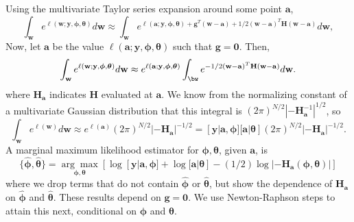 \documentclass[12pt, titlepage]{article}
\begin{document}
Using the multivariate Taylor series expansion around some point $\mathbf{a}$,
$$
\int_\mathbf{w} e^{\ell(\mathbf{w};\mathbf{y},\boldsymbol{\phi},\boldsymbol{\theta})} d\mathbf{w} \approx \int_\mathbf{w} e^{\ell(\mathbf{a};\mathbf{y},\boldsymbol{\phi},\boldsymbol{\theta}) + \mathbf{g}^{T}(\mathbf{w} -\mathbf{a}) + 1/2(\mathbf{w} - \mathbf{a})^{T}\mathbf{H}(\mathbf{w} - \mathbf{a})} d\mathbf{w},
$$
Now, let $\mathbf{a}$ be the value $\ell(\mathbf{a};\mathbf{y},\boldsymbol{\phi},\boldsymbol{\theta})$ such that $\mathbf{g} = \mathbf{0}$. Then,
$$
\int_\mathbf{w} e^{\ell(\mathbf{w};\mathbf{y},\boldsymbol{\phi},\boldsymbol{\theta})} d\mathbf{w} \approx e^{\ell(\mathbf{a};\mathbf{y},\boldsymbol{\phi},\boldsymbol{\theta})} \int_\bw e^{ -  
	1/2(\mathbf{w} - \mathbf{a})^{T}\mathbf{H}(\mathbf{w} - \mathbf{a})} d\mathbf{w}.
$$
where $\mathbf{H}_\mathbf{a}$ indicates $\mathbf{H}$ evaluated at $\mathbf{a}$. We know from the normalizing constant of a multivariate Gaussian distribution that this integral is $(2\pi)^{N/2}|-\mathbf{H}^{-1}_\mathbf{a}|^{1/2}$, so
\[
\int_\mathbf{w} e^{\ell(\mathbf{w})} d\mathbf{w} \approx e^{\ell(\mathbf{a})} (2\pi)^{N/2}|-\mathbf{H}_\mathbf{a}|^{-1/2} = [\mathbf{y}|\mathbf{a},\boldsymbol{\phi}][\mathbf{a}|\boldsymbol{\theta}](2\pi)^{N/2}|-\mathbf{H}_\mathbf{a}|^{-1/2}.
\]
A marginal maximum likelihood estimator for $\boldsymbol{\phi}, \boldsymbol{\theta}$, given $\mathbf{a}$, is
\begin{equation} \label{eq:m2LLmargMLE}
\{\hat{\boldsymbol{\phi}}, \hat{\boldsymbol{\theta}} \} = \underset{\boldsymbol{\phi},\boldsymbol{\theta}}{\arg\max} \left[ \log[\mathbf{y}|\mathbf{a},\mathbf{\phi}] +
	\log[\mathbf{a}|\mathbf{\theta}] - (1/2)\log|-\mathbf{H}_\mathbf{a}(\boldsymbol{\phi},\boldsymbol{\theta})| \right]
\end{equation}
where we drop terms that do not contain $\hat{\boldsymbol{\phi}}$ or $\hat{\boldsymbol{\theta}}$, but show the dependence of $\mathbf{H}_\mathbf{a}$ on $\hat{\boldsymbol{\phi}}$ and $\hat{\boldsymbol{\theta}}$.  These results depend on $\mathbf{g} = \mathbf{0}$.  We use Newton-Raphson steps to attain this next, conditional on $\boldsymbol{\phi}$ and $\boldsymbol{\theta}$.
\end{document}
